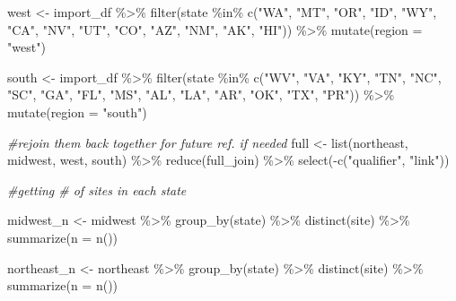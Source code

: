 \documentclass[12pt, twoside]{amherstthesis}
\newenvironment{Shaded}{\begin{snugshade}}{\end{snugshade}}
\newcommand{\AttributeTok}[1]{\textcolor[rgb]{0.77,0.63,0.00}{#1}}
\newcommand{\CommentTok}[1]{\textcolor[rgb]{0.56,0.35,0.01}{\textit{#1}}}
\newcommand{\FunctionTok}[1]{\textcolor[rgb]{0.00,0.00,0.00}{#1}}
\newcommand{\NormalTok}[1]{#1}
\newcommand{\OtherTok}[1]{\textcolor[rgb]{0.56,0.35,0.01}{#1}}
\newcommand{\SpecialCharTok}[1]{\textcolor[rgb]{0.00,0.00,0.00}{#1}}
\newcommand{\StringTok}[1]{\textcolor[rgb]{0.31,0.60,0.02}{#1}}
\begin{document}
\begin{Shaded}
\begin{Highlighting}[]
\NormalTok{west }\OtherTok{\textless{}{-}}\NormalTok{ import\_df }\SpecialCharTok{\%\textgreater{}\%}
  \FunctionTok{filter}\NormalTok{(state }\SpecialCharTok{\%in\%} \FunctionTok{c}\NormalTok{(}\StringTok{"WA"}\NormalTok{, }\StringTok{"MT"}\NormalTok{, }\StringTok{"OR"}\NormalTok{, }\StringTok{"ID"}\NormalTok{, }\StringTok{"WY"}\NormalTok{, }\StringTok{"CA"}\NormalTok{, }\StringTok{"NV"}\NormalTok{, }
                      \StringTok{"UT"}\NormalTok{, }\StringTok{"CO"}\NormalTok{, }\StringTok{"AZ"}\NormalTok{, }\StringTok{"NM"}\NormalTok{, }\StringTok{"AK"}\NormalTok{, }\StringTok{"HI"}\NormalTok{)) }\SpecialCharTok{\%\textgreater{}\%}
  \FunctionTok{mutate}\NormalTok{(}\AttributeTok{region =} \StringTok{"west"}\NormalTok{)}

\NormalTok{south }\OtherTok{\textless{}{-}}\NormalTok{ import\_df }\SpecialCharTok{\%\textgreater{}\%}
  \FunctionTok{filter}\NormalTok{(state }\SpecialCharTok{\%in\%} \FunctionTok{c}\NormalTok{(}\StringTok{"WV"}\NormalTok{, }\StringTok{"VA"}\NormalTok{, }\StringTok{"KY"}\NormalTok{, }\StringTok{"TN"}\NormalTok{, }\StringTok{"NC"}\NormalTok{, }\StringTok{"SC"}\NormalTok{, }\StringTok{"GA"}\NormalTok{, }
                      \StringTok{"FL"}\NormalTok{, }\StringTok{"MS"}\NormalTok{, }\StringTok{"AL"}\NormalTok{, }\StringTok{"LA"}\NormalTok{, }\StringTok{"AR"}\NormalTok{, }\StringTok{"OK"}\NormalTok{, }\StringTok{"TX"}\NormalTok{, }\StringTok{"PR"}\NormalTok{)) }\SpecialCharTok{\%\textgreater{}\%}
  \FunctionTok{mutate}\NormalTok{(}\AttributeTok{region =} \StringTok{"south"}\NormalTok{)}

\CommentTok{\#rejoin them back together for future ref. if needed}
\NormalTok{full }\OtherTok{\textless{}{-}} \FunctionTok{list}\NormalTok{(northeast, midwest, west, south) }\SpecialCharTok{\%\textgreater{}\%} 
  \FunctionTok{reduce}\NormalTok{(full\_join) }\SpecialCharTok{\%\textgreater{}\%}
  \FunctionTok{select}\NormalTok{(}\SpecialCharTok{{-}}\FunctionTok{c}\NormalTok{(}\StringTok{"qualifier"}\NormalTok{, }\StringTok{"link"}\NormalTok{))}

\CommentTok{\#getting \# of sites in each state}

\NormalTok{midwest\_n }\OtherTok{\textless{}{-}}\NormalTok{ midwest }\SpecialCharTok{\%\textgreater{}\%}
  \FunctionTok{group\_by}\NormalTok{(state) }\SpecialCharTok{\%\textgreater{}\%}
  \FunctionTok{distinct}\NormalTok{(site) }\SpecialCharTok{\%\textgreater{}\%}
  \FunctionTok{summarize}\NormalTok{(}\AttributeTok{n =} \FunctionTok{n}\NormalTok{())}

\NormalTok{northeast\_n }\OtherTok{\textless{}{-}}\NormalTok{ northeast }\SpecialCharTok{\%\textgreater{}\%}
  \FunctionTok{group\_by}\NormalTok{(state) }\SpecialCharTok{\%\textgreater{}\%}
  \FunctionTok{distinct}\NormalTok{(site) }\SpecialCharTok{\%\textgreater{}\%}
  \FunctionTok{summarize}\NormalTok{(}\AttributeTok{n =} \FunctionTok{n}\NormalTok{())}


\end{Highlighting}
\end{Shaded}
\end{document}
